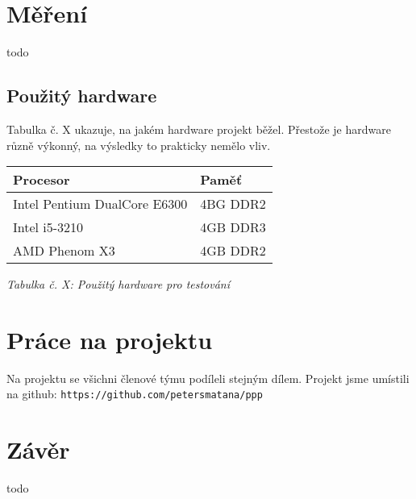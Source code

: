 \documentclass{article}
\begin{document}
\section{Měření}
{\color{red}todo}

\subsection{Použitý hardware}
Tabulka č. X ukazuje, na jakém hardware projekt běžel. Přestože je hardware
různě výkonný, na výsledky to prakticky nemělo vliv.
\newline
\begin{center}
	\begin{tabular}{ l | l }
		\textbf{Procesor} & \textbf{Paměť} \\
		\hline
		\hline
		Intel Pentium DualCore E6300 & 4BG DDR2 \\
		\hline
		Intel i5-3210 & 4GB DDR3 \\
		\hline
		AMD Phenom X3 & 4GB DDR2 \\
	\end{tabular}
	\newline
	\textit{Tabulka č. X: Použitý hardware pro testování}
\end{center}

\section{Práce na projektu}
Na projektu se všichni členové týmu podíleli stejným dílem. Projekt jsme
umístili na github: \texttt{https://github.com/petersmatana/ppp}

\section{Závěr}
{\color{red}todo}
\end{document}
